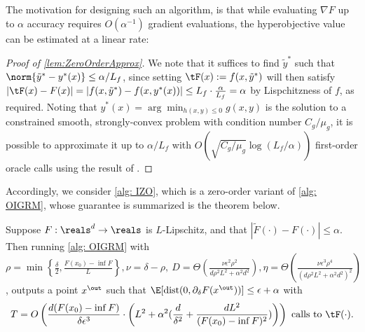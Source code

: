 The motivation for designing such an algorithm, is that
while evaluating $\nabla F$ up to $\alpha$ accuracy requires $O(\alpha^{-1})$ gradient evaluations, the hyperobjective value can be estimated at a linear rate:

\lemZeroOrderApprox*
\begin{proof}[Proof of \cref{lem:ZeroOrderApprox}]
    We note that it suffices to find $\tilde{y}^*$ such that $\norm{\tilde{y}^*-y^*(x)}\leq \alpha/L_f$, since setting $\tF(x):=f(x,\tilde{y}^*)$ will then satisfy $|\tF(x)-F(x)|=|f(x,\tilde{y}^*)-f(x,y^*(x))|\leq L_f\cdot \tfrac{\alpha}{L_f}=\alpha$ by Lispchitzness of $f$, as required. Noting that $y^*(x)=\arg\min_{h(x,y)\leq 0}g(x,y)$ is the solution to a constrained smooth, strongly-convex problem with condition number $C_g/\mu_g$, it is possible to approximate it up to $\alpha/L_f$ with $O(\sqrt{C_g/\mu_g}\log(L_f/\alpha))$ first-order oracle calls using the result of \citet{zhang2022solving}.
\end{proof}


Accordingly, we consider \cref{alg: IZO}, which is a zero-order variant of \cref{alg: OIGRM}, whose guarantee is summarized is the theorem below.



\begin{theorem} \label{thm: Lipschitz-min-with-inexact-zero-oracle}
Suppose $F:\reals^d\to\reals$ is $L$-Lipschitz, 
and that $|\widetilde{F}(\cdot)-F(\cdot)|\leq\alpha$.
Then running \cref{alg: OIGRM} with
$\rho=\min\left\{\tfrac{\delta}{2},\tfrac{F(x_0)-\inf F}{L}\right\},\nu=\delta-\rho,~D=\Theta\left(\frac{\nu\epsilon^2\rho^2}{d\rho^2 L^2+\alpha^2 d^2}\right),\eta=\Theta\left(\frac{\nu\epsilon^3\rho^4}{(d\rho^2L^2+\alpha^2d^2)^2}\right)$,
outputs a point $x^{\out}$ such that $\E[\mathrm{dist}(0,{\partial}_\delta F(x^{\out}))]\leq\epsilon+\alpha$ with
\[T=
O\left(\frac{d(F(x_0)-\inf F)}{\delta\epsilon^3}\cdot \left(L^2+\alpha^2 (\frac{d}{\delta^{2}}+\frac{dL^2}{(F(x_0)-\inf F)^2})\right)\right)
\text{ calls to } \tF(\cdot).\]
\end{theorem}


